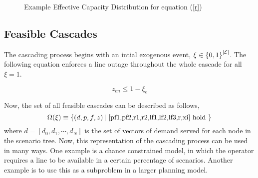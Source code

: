 \begin{figure}
\centering
{}


\caption{ Example Effective Capacity Distribution for equation (\ref{r}) }
\label{cdf}
\end{figure}



\subsection{Feasible Cascades}
The cascading process begins with an intial exogenous event, $\xi \in \left\{ 0, 1 \right\}^{\left| \mathcal{E} \right|}$.  The following equation enforces a line outage throughout the whole cascade for all $\xi = 1$.

\begin{equation}
z_{en} \le 1- \xi_e  \label{xi}
\end{equation}

Now, the set of all feasible cascades can be described as follows, 
\begin{equation}
\Omega(\xi) \equiv \left\{ \left(d, p, f, z \right)  |  \mbox{ \cref{pf1,pf2,r1,r2,lf1,lf2,lf3,r,xi}  hold } \right\} 
\end{equation}
where $d = \left[ d_0, d_1, \cdots, d_N \right]$ is the set of vectors of demand served for each node in the scenario tree.  Now, this representation of the cascading process can be used in many ways.  One example is a chance constrained model, in which the operator requires a line to be available in a certain percentage of scenarios.  Another example is to use this as a subproblem in a larger planning model. 

